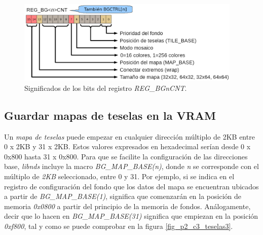\begin{figure}[t]
\centering
\includegraphics[height=4cm]{Figuras/C7/c7_reg_teselado.PNG}
\caption{Significados de los bits del registro \textit{REG\_BGnCNT}.}
\label{fig_p2_c3_reg_teselado}
\end{figure}

\subsection{Guardar mapas de teselas en la VRAM}
Un \textit{mapa de teselas} puede empezar en cualquier dirección múltiplo de 2KB entre 0 x 2KB y 31 x 2KB. Estos valores expresados en hexadecimal serían desde 0 x 0x800 hasta 31 x 0x800. Para que se facilite la configuración de las direcciones base, \textit{libnds} incluye la macro \textit{BG\_MAP\_BASE(n)}, donde \textit{n} se corresponde con el múltiplo de \textit{2KB} seleccionado, entre 0 y 31. Por ejemplo, si se indica en el registro de configuración del fondo que los datos del mapa se encuentran ubicados a partir de \textit{BG\_MAP\_BASE(1)}, significa que comenzarán en la posición de memoria \textit{0x0800} a partir del principio de la memoria de fondos. Análogamente, decir que lo hacen en \textit{BG\_MAP\_BASE(31)} significa que empiezan en la posición \textit{\textit{0xf800}}, tal y como se puede comprobar en la figura \ref{fig_p2_c3_teselas3}.

